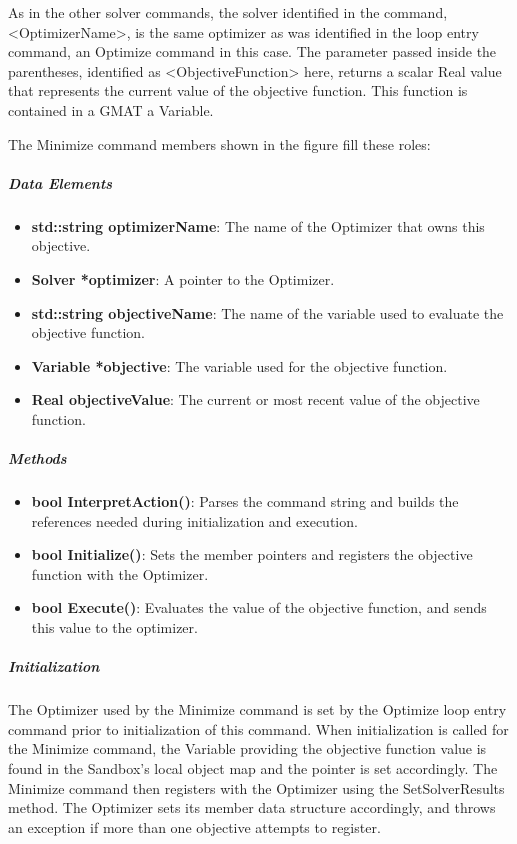 \noindent As in the other solver commands, the solver identified in the command, <OptimizerName>, is
the same optimizer as was identified in the loop entry command, an Optimize command in this case.
The parameter passed inside the parentheses, identified as <ObjectiveFunction> here, returns a
scalar Real value that represents the current value of the objective function.  This function is
contained in a GMAT a Variable.

The Minimize command members shown in the figure fill these roles:

\subparagraph{Data Elements}

\begin{itemize}
\item \textbf{std::string optimizerName}: The name of the Optimizer that owns this objective.
\item \textbf{Solver *optimizer}: A pointer to the Optimizer.
\item \textbf{std::string objectiveName}: The name of the variable used to evaluate the objective
function.
\item \textbf{Variable *objective}: The variable used for the objective function.
\item \textbf{Real objectiveValue}: The current or most recent value of the objective function.
\end{itemize}

\subparagraph{Methods}

\begin{itemize}
\item \textbf{bool InterpretAction()}:  Parses the command string and builds the references needed
during initialization and execution.
\item \textbf{bool Initialize()}:   Sets the member pointers and registers the objective function
with the Optimizer.
\item \textbf{bool Execute()}:  Evaluates the value of the objective function, and sends this value
to the optimizer.
\end{itemize}

\subparagraph{Initialization}  The Optimizer used by the Minimize command is set by the Optimize
loop entry command prior to initialization of this command.  When initialization is called for the
Minimize command, the Variable providing the objective function value is found in the Sandbox's
local object map and the pointer is set accordingly.  The Minimize command then registers with the
Optimizer using the SetSolverResults method.  The Optimizer sets its member data structure
accordingly, and throws an exception if more than one objective attempts to register.


